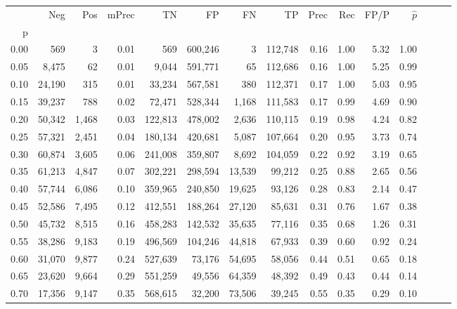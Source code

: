 \begin{tabular}{rrrrrrrrrrrrrrr}
\toprule
{} &     Neg &    Pos & mPrec &       TN &       FP &       FN &       TP &  Prec &   Rec &  FP/P & $\hat{p}$ \\
p    &         &        &       &          &          &          &          &       &       &       &           \\
\midrule
0.00 &     569 &      3 &  0.01 &      569 &  600,246 &        3 &  112,748 &  0.16 &  1.00 &  5.32 &      1.00 \\
0.05 &   8,475 &     62 &  0.01 &    9,044 &  591,771 &       65 &  112,686 &  0.16 &  1.00 &  5.25 &      0.99 \\
0.10 &  24,190 &    315 &  0.01 &   33,234 &  567,581 &      380 &  112,371 &  0.17 &  1.00 &  5.03 &      0.95 \\
0.15 &  39,237 &    788 &  0.02 &   72,471 &  528,344 &    1,168 &  111,583 &  0.17 &  0.99 &  4.69 &      0.90 \\
0.20 &  50,342 &  1,468 &  0.03 &  122,813 &  478,002 &    2,636 &  110,115 &  0.19 &  0.98 &  4.24 &      0.82 \\
0.25 &  57,321 &  2,451 &  0.04 &  180,134 &  420,681 &    5,087 &  107,664 &  0.20 &  0.95 &  3.73 &      0.74 \\
0.30 &  60,874 &  3,605 &  0.06 &  241,008 &  359,807 &    8,692 &  104,059 &  0.22 &  0.92 &  3.19 &      0.65 \\
0.35 &  61,213 &  4,847 &  0.07 &  302,221 &  298,594 &   13,539 &   99,212 &  0.25 &  0.88 &  2.65 &      0.56 \\
0.40 &  57,744 &  6,086 &  0.10 &  359,965 &  240,850 &   19,625 &   93,126 &  0.28 &  0.83 &  2.14 &      0.47 \\
0.45 &  52,586 &  7,495 &  0.12 &  412,551 &  188,264 &   27,120 &   85,631 &  0.31 &  0.76 &  1.67 &      0.38 \\
0.50 &  45,732 &  8,515 &  0.16 &  458,283 &  142,532 &   35,635 &   77,116 &  0.35 &  0.68 &  1.26 &      0.31 \\
0.55 &  38,286 &  9,183 &  0.19 &  496,569 &  104,246 &   44,818 &   67,933 &  0.39 &  0.60 &  0.92 &      0.24 \\
0.60 &  31,070 &  9,877 &  0.24 &  527,639 &   73,176 &   54,695 &   58,056 &  0.44 &  0.51 &  0.65 &      0.18 \\
0.65 &  23,620 &  9,664 &  0.29 &  551,259 &   49,556 &   64,359 &   48,392 &  0.49 &  0.43 &  0.44 &      0.14 \\
0.70 &  17,356 &  9,147 &  0.35 &  568,615 &   32,200 &   73,506 &   39,245 &  0.55 &  0.35 &  0.29 &      0.10 \\

\end{tabular}
